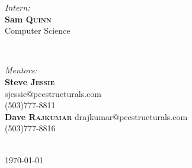 \documentclass[letterpaper,10pt,notitlepage,fleqn]{article}
\begin{document}
\begin{titlepage}
\begin{minipage}{0.4\textwidth}
\begin{flushleft} \large
\emph{Intern:}\\
        \textbf{Sam \textsc{Quinn}} \\ %
        {\small Computer Science}
        \end{flushleft}
        \end{minipage}
        ~
        \begin{minipage}{0.4\textwidth}
        \begin{flushright} \large
        \emph{Mentors:} \\
            \textbf{Steve \textsc{Jessie}} \\ %
            {\small sjessie@pccstructurals.com \\
            (503)777-8811} \\
            
            \textbf{Dave \textsc{Rajkumar}}
            {\small drajkumar@pccstructurals.com \\
            (503)777-8816}
            \end{flushright}
            \end{minipage}\\[3cm]



{\large \today}\\[3cm] %




\vfill %



\end{titlepage}
\end{document}

